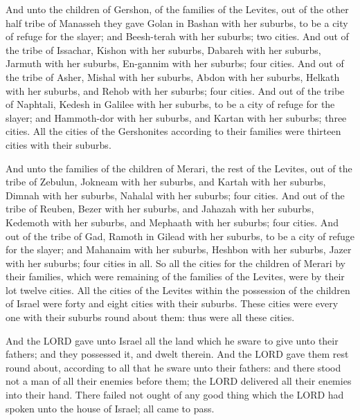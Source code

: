  And unto the children of Gershon, of the families of the
Levites, out of the other half tribe of Manasseh they gave Golan in
Bashan with her suburbs, to be a city of refuge for the slayer; and
Beesh-terah with her suburbs; two cities.  And out of the
tribe of Issachar, Kishon with her suburbs, Dabareh with her suburbs,
 Jarmuth with her suburbs, En-gannim with her suburbs;
four cities.  And out of the tribe of Asher, Mishal with
her suburbs, Abdon with her suburbs,  Helkath with her
suburbs, and Rehob with her suburbs; four cities.  And
out of the tribe of Naphtali, Kedesh in Galilee with her suburbs, to be
a city of refuge for the slayer; and Hammoth-dor with her suburbs, and
Kartan with her suburbs; three cities.  All the cities of
the Gershonites according to their families were thirteen cities with
their suburbs.

 And unto the families of the children of Merari, the
rest of the Levites, out of the tribe of Zebulun, Jokneam with her
suburbs, and Kartah with her suburbs,  Dimnah with her
suburbs, Nahalal with her suburbs; four cities.  And out
of the tribe of Reuben, Bezer with her suburbs, and Jahazah with her
suburbs,  Kedemoth with her suburbs, and Mephaath with
her suburbs; four cities.  And out of the tribe of Gad,
Ramoth in Gilead with her suburbs, to be a city of refuge for the
slayer; and Mahanaim with her suburbs,  Heshbon with her
suburbs, Jazer with her suburbs; four cities in all.  So
all the cities for the children of Merari by their families, which were
remaining of the families of the Levites, were by their lot twelve
cities.  All the cities of the Levites within the
possession of the children of Israel were forty and eight cities with
their suburbs.  These cities were every one with their
suburbs round about them: thus were all these cities.

 And the LORD gave unto Israel all the land which he
sware to give unto their fathers; and they possessed it, and dwelt
therein.  And the LORD gave them rest round about,
according to all that he sware unto their fathers: and there stood not a
man of all their enemies before them; the LORD delivered all their
enemies into their hand.  There failed not ought of any
good thing which the LORD had spoken unto the house of Israel; all came
to pass.

